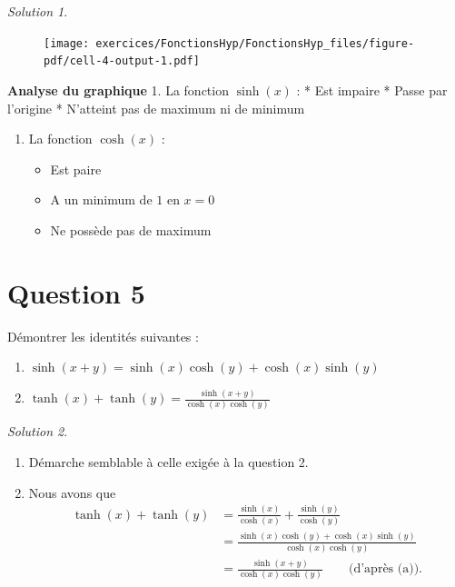 \documentclass[
  12pt,
  letterpaper,
]{book}
\providecommand{\tightlist}{%
  \setlength{\itemsep}{0pt}\setlength{\parskip}{0pt}}\usepackage{longtable,booktabs,array}
\theoremstyle{remark}
\newtheorem*{solution}{Solution}
\begin{document}
\begin{solution}
\begin{figure}[H]
{\centering \texttt{[image: exercices/FonctionsHyp/FonctionsHyp\_files/figure-pdf/cell-4-output-1.pdf]}

}

\end{figure}

\textbf{Analyse du graphique} 1. La fonction \(\sinh(x)\) : * Est
impaire * Passe par l'origine * N'atteint pas de maximum ni de minimum

\begin{enumerate}
\def\labelenumi{\arabic{enumi}.}
\setcounter{enumi}{1}
\tightlist
\item
  La fonction \(\cosh(x)\) :

  \begin{itemize}
  \tightlist
  \item
    Est paire
  \item
    A un minimum de \(1\) en \(x = 0\)
  \item
    Ne possède pas de maximum
  \end{itemize}
\end{enumerate}

\end{solution}

\hypertarget{question-5-3}{%
\section{Question 5}\label{question-5-3}}

Démontrer les identités suivantes :

\begin{enumerate}
\def\labelenumi{\arabic{enumi}.}
\item
  \(\sinh(x+y) = \sinh(x)\cosh(y) + \cosh(x)\sinh(y)\)
\item
  \(\tanh(x) + \tanh(y) = \frac{\sinh(x+y)}{\cosh(x)\cosh(y)}\)
\end{enumerate}

\begin{solution}

\begin{enumerate}
\def\labelenumi{\arabic{enumi}.}
\item
  Démarche semblable à celle exigée à la question 2.
\item
  Nous avons que \begin{align}
  \tanh(x) + \tanh(y) &= \frac{\sinh(x)}{\cosh(x)} + \frac{\sinh(y)}{\cosh(y)}\\
  &= \frac{\sinh(x)\cosh(y) + \cosh(x)\sinh(y)}{\cosh(x)\cosh(y)}\\
  &= \frac{\sinh(x+y)}{\cosh(x)\cosh(y)}\qquad\text{(d'après (a)).}
  \end{align}
\end{enumerate}

\end{solution}
\end{document}
